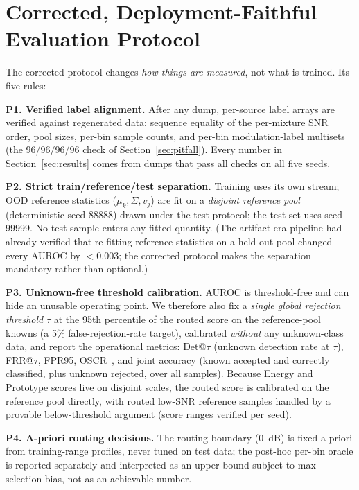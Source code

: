 \documentclass[review,12pt]{elsarticle}
\begin{document}
\section{Corrected, Deployment-Faithful Evaluation Protocol}
\label{sec:protocol}

The corrected protocol changes \emph{how things are measured}, not what
is trained. Its five rules:

\textbf{P1. Verified label alignment.} After any dump, per-source label
arrays are verified against regenerated data: sequence equality of the
per-mixture SNR order, pool sizes, per-bin sample counts, and per-bin
modulation-label multisets (the $96/96/96/96$ check of
Section~\ref{sec:pitfall}). Every number in Section~\ref{sec:results}
comes from dumps that pass all checks on all five seeds.

\textbf{P2. Strict train/reference/test separation.} Training uses its
own stream; OOD reference statistics ($\mu_k, \Sigma, v_j$) are fit on
a \emph{disjoint reference pool} (deterministic seed 88888) drawn under
the test protocol; the test set uses seed 99999. No test sample enters
any fitted quantity. (The artifact-era pipeline had already verified
that re-fitting reference statistics on a held-out pool changed every
AUROC by $<0.003$; the corrected protocol makes the separation
mandatory rather than optional.)

\textbf{P3. Unknown-free threshold calibration.} AUROC is
threshold-free and can hide an unusable operating point. We therefore
also fix a \emph{single global rejection threshold} $\tau$ at the 95th
percentile of the routed score on the reference-pool knowns (a 5\%
false-rejection-rate target), calibrated \emph{without} any
unknown-class data, and report the operational metrics:
Det@$\tau$ (unknown detection rate at $\tau$), FRR@$\tau$,
FPR95, OSCR~\cite{dhamija2018oscr}, and joint accuracy (known accepted
and correctly classified, plus unknown rejected, over all samples).
Because Energy and Prototype scores live on disjoint scales, the
routed score is calibrated on the reference pool directly, with
routed low-SNR reference samples handled by a provable below-threshold
argument (score ranges verified per seed).

\textbf{P4. A-priori routing decisions.} The routing boundary
(\SI{0}{dB}) is fixed a priori from training-range profiles, never
tuned on test data; the post-hoc per-bin oracle is reported separately
and interpreted as an upper bound subject to max-selection bias, not
as an achievable number.
\end{document}
